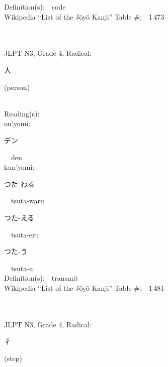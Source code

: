 \begin{multicols}{2}
Definition(s):\ \ code \\
Wikipedia ``List of the J\=oy\=o Kanji'' Table \#:\ \ 1\,473 \\
\ \ \\
{\fontsize{34pt}{40pt}  }\ \ \\  %
{JLPT N3, Grade 4, Radical:\ \ {\begin{CJK}{UTF8}{min} 人 \end{CJK}} (person) } \\
Reading(s):\ \ \\
{\hspace*{1em}}on'yomi:\ \ \\
{\hspace*{2em}}{\begin{CJK}{UTF8}{min} デン \end{CJK}}\ \ den\ \ \\
{\hspace*{1em}}kun'yomi:\ \ \\
{\hspace*{2em}}{\begin{CJK}{UTF8}{min} つた-わる \end{CJK}}\ \ tsuta-waru\ \ \\
{\hspace*{2em}}{\begin{CJK}{UTF8}{min} つた-える \end{CJK}}\ \ tsuta-eru\ \ \\
{\hspace*{2em}}{\begin{CJK}{UTF8}{min} つた-う \end{CJK}}\ \ tsuta-u\ \ \\
Definition(s):\ \ transmit \\
Wikipedia ``List of the J\=oy\=o Kanji'' Table \#:\ \ 1\,481 \\
\ \ \\
{\fontsize{34pt}{40pt}  }\ \ \\  %
{JLPT N3, Grade 4, Radical:\ \ {\begin{CJK}{UTF8}{min} 彳 \end{CJK}} (step) } \\

\end{multicols}
